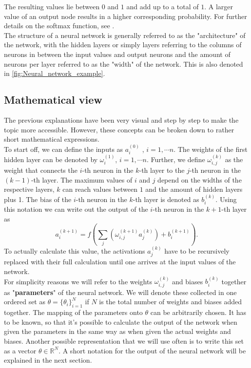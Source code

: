 The resulting values lie between $0$ and $1$ and add up to a total of $1$. A larger value of an output node results in a higher corresponding probability. For further details on the softmax function, see \cite{gao2018properties}.\\
The structure of a neural network is generally referred to as the "architecture" of the network, with the hidden layers or simply layers referring to the columns of neurons in between the input values and output neurons and the amount of neurons per layer referred to as the "width" of the network. This is also denoted in \cref{fig:Neural_network_example}. 
\subsection{Mathematical view}
The previous explanations have been very visual and step by step to make the topic more accessible. However, these concepts can be broken down to rather short mathematical expressions.\\
To start off, we can define the inputs as $a_i^{(0)}$ , $i =  1, \dotsb n$. The weights of the first hidden layer can be denoted by $\omega_{i}^{(1)}$, $i =  1, \dotsb n$. Further, we define $\omega_{i,j}^{(k)}$ as the weight that connects the $i$-th neuron in the $k$-th layer to the $j$-th neuron in the $(k-1)$-th layer. The maximum values of $i$ and $j$ depend on the widths of the respective layers, $k$ can reach values between $1$ and the amount of hidden layers plus 1. The bias of the $i$-th neuron in the $k$-th layer is denoted as $b_i^{(k)}$. Using this notation we can write out the output of the $i$-th neuron in the $k+1$-th layer as \cite{NeuralNetworksBook}
\begin{equation}
	a_i^{(k+1)} = f\left(\sum_j \left(\omega_{i,j}^{(k+1)}a_j^{(k)}\right) + b_i^{(k+1)}\right).
\end{equation}
To actually calculate this value, the activations $a_j^{(k)}$ have to be recursively replaced with their full calculation until one arrives at the input values of the network.\\
For simplicity reasons we will refer to the weights $\omega_{i,j}^{(k)}$ and biases $b_i^{(k)}$ together as "\textbf{parameters}" of the neural network. We will denote these collected in one ordered set as $\theta = \{\theta_i\}_{i=1}^{N}$ if $N$ is the total number of weights and biases added together. The mapping of the parameters onto $\theta$ can be arbitrarily chosen. It has to be known, so that it's possible to calculate the output of the network when given the parameters in the same way as when given the actual weights and biases. Another possible representation that we will use often is to write this set as a vector $\theta \in \mathbb{R}^N$. A short notation for the output of the neural network will be explained in the next section.
